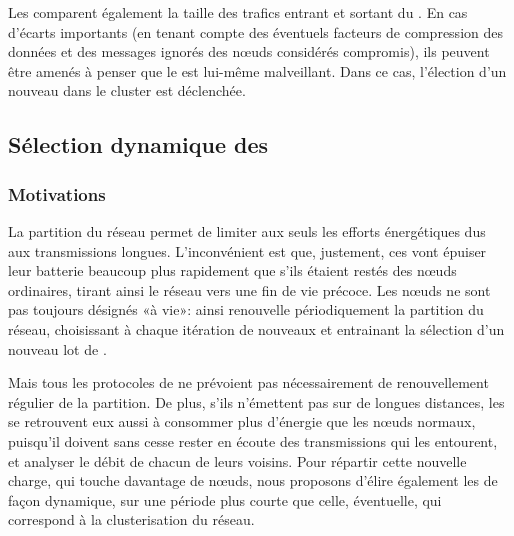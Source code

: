Les \cns comparent également la taille des trafics entrant et sortant du \ch.
En cas d'écarts importants (en tenant compte des éventuels facteurs de compression des données et des messages ignorés des nœuds considérés compromis), ils peuvent être amenés à penser que le \ch est lui-même malveillant.
Dans ce cas, l'élection d'un nouveau \CH dans le cluster est déclenchée.

    \subsection{Sélection dynamique des \cns}

        \subsubsection{Motivations}
La partition du réseau permet de limiter aux seuls \chs les efforts énergétiques dus aux transmissions longues.
L'inconvénient est que, justement, ces \CH vont épuiser leur batterie beaucoup plus rapidement que s'ils étaient restés des nœuds ordinaires, tirant ainsi le réseau vers une fin de vie précoce.
Les nœuds ne sont pas toujours désignés \CH «à vie»: ainsi \leach renouvelle périodiquement la partition du réseau, choisissant à chaque itération de nouveaux \chs et entrainant la sélection d'un nouveau lot de \cns.

Mais tous les protocoles de  ne prévoient pas nécessairement de renouvellement régulier de la partition.
De plus, s'ils n'émettent pas sur de longues distances, les \cns se retrouvent eux aussi à consommer plus d'énergie que les nœuds normaux, puisqu'il doivent sans cesse rester en écoute des transmissions qui les entourent, et analyser le débit de chacun de leurs voisins.
Pour répartir cette nouvelle charge, qui touche davantage de nœuds, nous proposons d'élire également les \cns de façon dynamique, sur une période plus courte que celle, éventuelle, qui correspond à la clusterisation du réseau.

